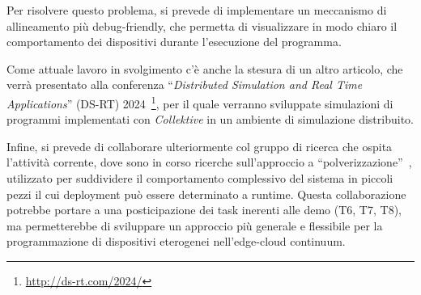 \documentclass[13pt, a4paper]{article}
\newcommand{\ck}{\emph{Collektive}}
\begin{document}
Per risolvere questo problema, si prevede di implementare un meccanismo di allineamento più debug-friendly,
    che permetta di visualizzare in modo chiaro il comportamento dei dispositivi durante l'esecuzione del programma.

Come attuale lavoro in svolgimento c'è anche la stesura di un altro articolo, che verrà presentato alla conferenza
    ``\emph{Distributed Simulation and Real Time Applications}'' (DS-RT) 2024~\footnote{\url{http://ds-rt.com/2024/}},
    per il quale verranno sviluppate simulazioni di programmi implementati con \ck{} in un ambiente di simulazione distribuito.

Infine, si prevede di collaborare ulteriormente col gruppo di ricerca che ospita l'attività corrente,
dove sono in corso
    ricerche sull'approccio a ``polverizzazione''~\cite{fi12110203},
    utilizzato per suddividere il comportamento complessivo del sistema
in piccoli pezzi il cui deployment può essere determinato a runtime.
%
Questa collaborazione potrebbe portare a una posticipazione dei task inerenti alle demo (T6, T7, T8), ma permetterebbe di sviluppare
    un approccio più generale e flessibile per la programmazione di dispositivi eterogenei nell'edge-cloud continuum.





\end{document}
